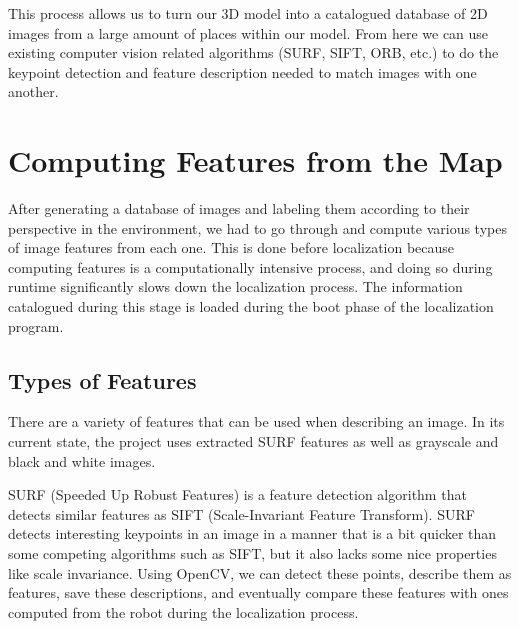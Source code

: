 \documentclass[a4paper,11pt]{article}
\begin{document}
  This process allows us to turn our 3D model into a catalogued database of 2D images from a large amount of places within our model. From here we can use existing computer vision related algorithms (SURF, SIFT, ORB, etc.) to do the keypoint detection and feature description needed to match images with one another.

 \newpage






















  \section{Computing Features from the Map}
After generating a database of images and labeling them according to their perspective in the environment, we had to go through and compute various types of image features from each one. This is done before localization because computing features is a computationally intensive process, and doing so during runtime significantly slows down the localization process. The information catalogued during this stage is loaded during the boot phase of the localization program.

  \subsection{Types of Features}
There are a variety of features that can be used when describing an image. In its current state, the project uses extracted SURF features as well as grayscale and black and white images.

SURF (Speeded Up Robust Features) is a feature detection algorithm that detects similar features as SIFT (Scale-Invariant Feature Transform). SURF detects interesting keypoints in an image in a manner that is a bit quicker than some competing algorithms such as SIFT, but it also lacks some nice properties like scale invariance. Using OpenCV, we can detect these points, describe them as features, save these descriptions, and eventually compare these features with ones computed from the robot during the localization process.
\end{document}
